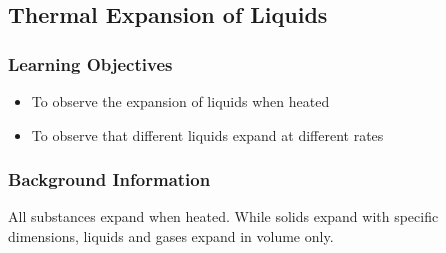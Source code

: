 

\subsection{Thermal Expansion of Liquids}

\subsubsection*{Learning Objectives}
\begin{itemize}
\item{To observe the expansion of liquids when heated} 
\item{To observe that different liquids expand at different rates} 
\end{itemize}

\subsubsection*{Background Information}
All substances expand when heated. While solids expand with specific dimensions, liquids and gases expand in volume only.  

